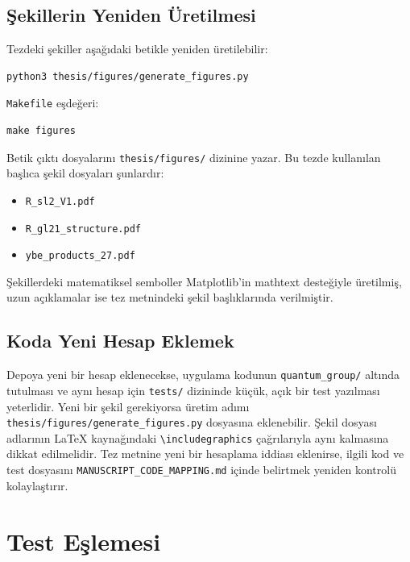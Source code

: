 \documentclass[10pt]{math}
\numberwithin{equation}{section}
\theoremstyle{plain}
\theoremstyle{definition}
\begin{document}
\subsection{Şekillerin Yeniden Üretilmesi}

Tezdeki şekiller aşağıdaki betikle yeniden üretilebilir:
\begin{lstlisting}[style=bashblock]
python3 thesis/figures/generate_figures.py
\end{lstlisting}

\texttt{Makefile} eşdeğeri:
\begin{lstlisting}[style=bashblock]
make figures
\end{lstlisting}

Betik çıktı dosyalarını \texttt{thesis/figures/} dizinine yazar. Bu tezde
kullanılan başlıca şekil dosyaları şunlardır:
\begin{itemize}[leftmargin=*]
  \item \texttt{R\_sl2\_V1.pdf}
  \item \texttt{R\_gl21\_structure.pdf}
  \item \texttt{ybe\_products\_27.pdf}
\end{itemize}

Şekillerdeki matematiksel semboller Matplotlib'in mathtext desteğiyle
üretilmiş, uzun açıklamalar ise tez metnindeki şekil başlıklarında verilmiştir.

\subsection{Koda Yeni Hesap Eklemek}

Depoya yeni bir hesap eklenecekse, uygulama kodunun
\texttt{quantum\_group/} altında tutulması ve aynı hesap için \texttt{tests/}
dizininde küçük, açık bir test yazılması yeterlidir. Yeni bir şekil gerekiyorsa
üretim adımı \texttt{thesis/figures/generate\_figures.py} dosyasına eklenebilir.
Şekil dosyası adlarının LaTeX kaynağındaki
\texttt{\textbackslash includegraphics} çağrılarıyla aynı kalmasına dikkat
edilmelidir. Tez metnine yeni bir hesaplama iddiası eklenirse, ilgili kod ve
test dosyasını \texttt{MANUSCRIPT\_CODE\_MAPPING.md} içinde belirtmek yeniden
kontrolü kolaylaştırır.

\section{Test Eşlemesi}
\end{document}
